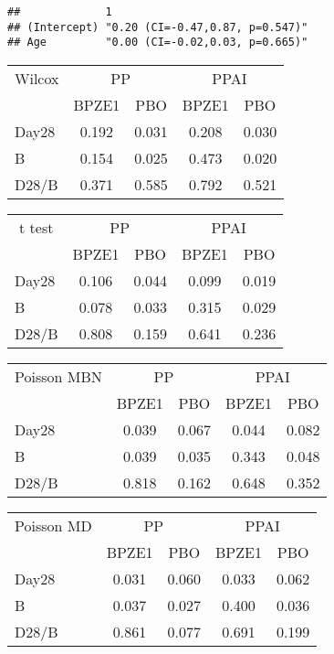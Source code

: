 \documentclass[
]{article}
\begin{document}
\begin{verbatim}
##             1                              
## (Intercept) "0.20 (CI=-0.47,0.87, p=0.547)"
## Age         "0.00 (CI=-0.02,0.03, p=0.665)"
\end{verbatim}

\begin{tabular}{>{}l|>{}c|>{}c|>{}c|c}
\hline
\multicolumn{1}{c|}{Wilcox} & \multicolumn{2}{c|}{PP} & \multicolumn{2}{c}{PPAI} \\
\cline{1-1} \cline{2-3} \cline{4-5}
  & BPZE1 & PBO & BPZE1 & PBO\\
\hline
Day28 & 0.192 & 0.031 & 0.208 & 0.030\\
\hline
B & 0.154 & 0.025 & 0.473 & 0.020\\
\hline
D28/B & 0.371 & 0.585 & 0.792 & 0.521\\
\hline
\end{tabular}

\begin{tabular}{>{}l|>{}c|>{}c|>{}c|c}
\hline
\multicolumn{1}{c|}{t test} & \multicolumn{2}{c|}{PP} & \multicolumn{2}{c}{PPAI} \\
\cline{1-1} \cline{2-3} \cline{4-5}
  & BPZE1 & PBO & BPZE1 & PBO\\
\hline
Day28 & 0.106 & 0.044 & 0.099 & 0.019\\
\hline
B & 0.078 & 0.033 & 0.315 & 0.029\\
\hline
D28/B & 0.808 & 0.159 & 0.641 & 0.236\\
\hline
\end{tabular}

\begin{tabular}{>{}l|>{}c|>{}c|>{}c|c}
\hline
\multicolumn{1}{c|}{Poisson MBN} & \multicolumn{2}{c|}{PP} & \multicolumn{2}{c}{PPAI} \\
\cline{1-1} \cline{2-3} \cline{4-5}
  & BPZE1 & PBO & BPZE1 & PBO\\
\hline
Day28 & 0.039 & 0.067 & 0.044 & 0.082\\
\hline
B & 0.039 & 0.035 & 0.343 & 0.048\\
\hline
D28/B & 0.818 & 0.162 & 0.648 & 0.352\\
\hline
\end{tabular}

\begin{tabular}{>{}l|>{}c|>{}c|>{}c|c}
\hline
\multicolumn{1}{c|}{Poisson MD} & \multicolumn{2}{c|}{PP} & \multicolumn{2}{c}{PPAI} \\
\cline{1-1} \cline{2-3} \cline{4-5}
  & BPZE1 & PBO & BPZE1 & PBO\\
\hline
Day28 & 0.031 & 0.060 & 0.033 & 0.062\\
\hline
B & 0.037 & 0.027 & 0.400 & 0.036\\
\hline
D28/B & 0.861 & 0.077 & 0.691 & 0.199\\
\hline
\end{tabular}
\end{document}

